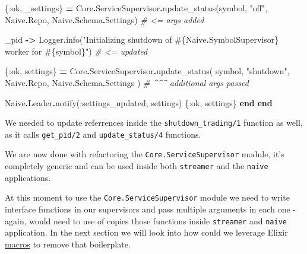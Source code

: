 \documentclass[
  oneside]{book}
\newenvironment{Shaded}{\begin{snugshade}}{\end{snugshade}}
\newcommand{\CommentTok}[1]{\textcolor[rgb]{0.56,0.35,0.01}{\textit{#1}}}
\newcommand{\ConstantTok}[1]{\textcolor[rgb]{0.00,0.00,0.00}{#1}}
\newcommand{\KeywordTok}[1]{\textcolor[rgb]{0.13,0.29,0.53}{\textbf{#1}}}
\newcommand{\NormalTok}[1]{#1}
\newcommand{\OperatorTok}[1]{\textcolor[rgb]{0.81,0.36,0.00}{\textbf{#1}}}
\newcommand{\OtherTok}[1]{\textcolor[rgb]{0.56,0.35,0.01}{#1}}
\newcommand{\StringTok}[1]{\textcolor[rgb]{0.31,0.60,0.02}{#1}}
\newcommand{\VariableTok}[1]{\textcolor[rgb]{0.00,0.00,0.00}{#1}}
\begin{document}
\begin{Shaded}
\begin{Highlighting}[]
\NormalTok{        \{}\VariableTok{:ok}\NormalTok{, \_settings\} }\OperatorTok{=}
          \ConstantTok{Core}\OperatorTok{.}\ConstantTok{ServiceSupervisor}\OperatorTok{.}\NormalTok{update\_status(symbol, }\StringTok{"off"}\NormalTok{, }\ConstantTok{Naive}\OperatorTok{.}\ConstantTok{Repo}\NormalTok{, }\ConstantTok{Naive}\OperatorTok{.}\ConstantTok{Schema}\OperatorTok{.}\ConstantTok{Settings}\NormalTok{) }\CommentTok{\# \textless{}= args added}

\NormalTok{      \_pid }\OperatorTok{{-}\textgreater{}}
        \ConstantTok{Logger}\OperatorTok{.}\NormalTok{info(}\StringTok{"Initializing shutdown of }\OtherTok{\#\{}\ConstantTok{Naive}\OperatorTok{.}\ConstantTok{SymbolSupervisor}\OtherTok{\}}\StringTok{ worker for }\OtherTok{\#\{}\NormalTok{symbol}\OtherTok{\}}\StringTok{"}\NormalTok{) }\CommentTok{\# \textless{}= updated}

\NormalTok{        \{}\VariableTok{:ok}\NormalTok{, settings\} }\OperatorTok{=}
          \ConstantTok{Core}\OperatorTok{.}\ConstantTok{ServiceSupervisor}\OperatorTok{.}\NormalTok{update\_status(}
\NormalTok{            symbol,}
            \StringTok{"shutdown"}\NormalTok{,}
            \ConstantTok{Naive}\OperatorTok{.}\ConstantTok{Repo}\NormalTok{,}
            \ConstantTok{Naive}\OperatorTok{.}\ConstantTok{Schema}\OperatorTok{.}\ConstantTok{Settings}
\NormalTok{          ) }\CommentTok{\# \^{}\^{}\^{} additional args passed}

        \ConstantTok{Naive}\OperatorTok{.}\ConstantTok{Leader}\OperatorTok{.}\NormalTok{notify(}\VariableTok{:settings\_updated}\NormalTok{, settings)}
\NormalTok{        \{}\VariableTok{:ok}\NormalTok{, settings\}}
    \KeywordTok{end}
  \KeywordTok{end}
\end{Highlighting}
\end{Shaded}

We needed to update referrences inside the \texttt{shutdown\_trading/1} function as well, as it calls \texttt{get\_pid/2} and \texttt{update\_status/4} functions.

We are now done with refactoring the \texttt{Core.ServiceSupervisor} module, it's completely generic and can be used inside both \texttt{streamer} and the \texttt{naive} applications.

At this moment to use the \texttt{Core.ServiceSupervisor} module we need to write interface functions in our supervisors and pass multiple arguments in each one - again, would need to use of copies those functions inside \texttt{streamer} and \texttt{naive} application. In the next section we will look into how could we leverage Elixir \href{https://elixir-lang.org/getting-started/meta/macros.html}{macros} to remove that boilerplate.
\end{document}
